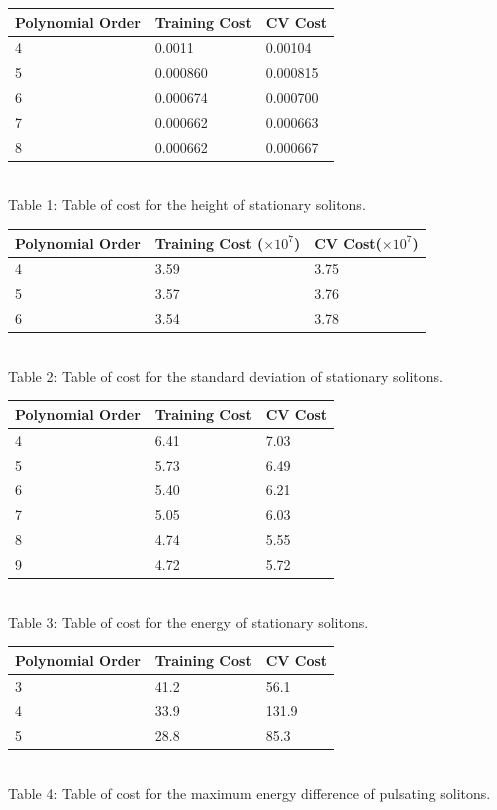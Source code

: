 \documentclass[a4paper,12pt]{report}
\begin{document}
\begin{center}
\begin{tabular}{|l|l|l|}
\hline
Polynomial Order & Training Cost & CV Cost\\
\hline
4&0.0011&0.00104\\
5&0.000860&0.000815\\
6&0.000674&0.000700\\
7&0.000662&0.000663\\
8&0.000662&0.000667\\
\hline
\end{tabular}
\\Table 1: Table of cost for the height of stationary solitons.
\end{center}
\begin{center}
\begin{tabular}{|l|l|l|}
\hline
Polynomial Order & Training Cost ($\times 10^7$) & CV Cost($\times 10^7$)\\
\hline
4&3.59&3.75\\
5&3.57&3.76\\
6&3.54&3.78\\
\hline
\end{tabular}
\\Table 2: Table of cost for the standard deviation of stationary solitons.
\end{center}
\begin{center}
\begin{tabular}{|l|l|l|}
\hline
Polynomial Order & Training Cost & CV Cost\\
\hline
4&6.41&7.03\\
5&5.73&6.49\\
6&5.40&6.21\\
7&5.05&6.03\\
8&4.74&5.55\\
9&4.72&5.72\\
\hline
\end{tabular}
\\Table 3: Table of cost for the energy of stationary solitons.
\end{center}
\begin{center}
\begin{tabular}{|l|l|l|}
\hline
Polynomial Order & Training Cost & CV Cost\\
\hline
3&41.2&56.1\\
4&33.9&131.9\\%
5&28.8&85.3\\
\hline
\end{tabular}
\\Table 4: Table of cost for the maximum energy difference of pulsating solitons.
\end{center}
\end{document}
